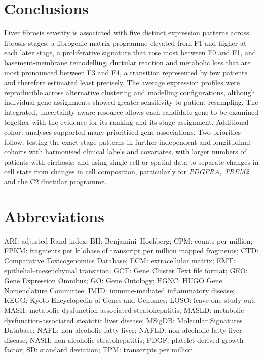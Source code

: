 \documentclass[11pt,a4paper]{article}
\begin{document}
\section*{Conclusions}
Liver fibrosis severity is associated with five distinct expression patterns across fibrosis stages: a fibrogenic matrix programme elevated from F1 and higher at each later stage, a proliferative signature that rose most between F0 and F1, and basement-membrane remodelling, ductular reaction and metabolic loss that are most pronounced between F3 and F4, a transition represented by few patients and therefore estimated least precisely. The average expression profiles were reproducible across alternative clustering and modelling configurations, although individual gene assignments showed greater sensitivity to patient resampling. The integrated, uncertainty-aware resource allows each candidate gene to be examined together with the evidence for its ranking and its stage assignment. Additional-cohort analyses supported many prioritised gene associations. Two priorities follow: testing the exact stage patterns in further independent and longitudinal cohorts with harmonised clinical labels and covariates, with larger numbers of patients with cirrhosis; and using single-cell or spatial data to separate changes in cell state from changes in cell composition, particularly for \textit{PDGFRA}, \textit{TREM2} and the C2 ductular programme.

\section*{Abbreviations}
ARI: adjusted Rand index; BH: Benjamini--Hochberg; CPM: counts per million; FPKM: fragments per kilobase of transcript per million mapped fragments; CTD: Comparative Toxicogenomics Database; ECM: extracellular matrix; EMT: epithelial--mesenchymal transition; GCT: Gene Cluster Text file format; GEO: Gene Expression Omnibus; GO: Gene Ontology; HGNC: HUGO Gene Nomenclature Committee; IMID: immune-mediated inflammatory disease; KEGG: Kyoto Encyclopedia of Genes and Genomes; LOSO: leave-one-study-out; MASH: metabolic dysfunction-associated steatohepatitis; MASLD: metabolic dysfunction-associated steatotic liver disease; MSigDB: Molecular Signatures Database; NAFL: non-alcoholic fatty liver; NAFLD: non-alcoholic fatty liver disease; NASH: non-alcoholic steatohepatitis; PDGF: platelet-derived growth factor; SD: standard deviation; TPM: transcripts per million.
\end{document}
